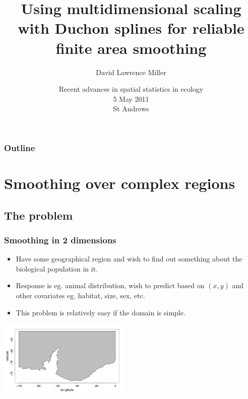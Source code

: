 \documentclass[ignorenonframetext]{beamer} %
\title[Smoothing over complex regions]{Using multidimensional scaling with Duchon splines for reliable finite area smoothing}
\author[Miller]{David Lawrence Miller}
\institute{Mathematical Sciences\\University of Bath}
\date[5 May 2011] {Recent advances in spatial statistics in ecology\\5 May 2011\\St Andrews}
\newcommand{\bc}{\begin{center}}
\newcommand{\ec}{\end{center}}
\newcommand{\bi}{\begin{itemize}}
\newcommand{\ei}{\end{itemize}}
\begin{document}
\begin{frame}
  \titlepage
\end{frame}


 {
\begin{frame}
  \frametitle{Outline}
  \tableofcontents %
\end{frame}
}

\section{Smoothing over complex regions}

\subsection{The problem}

\begin{frame}
	\frametitle{Smoothing in 2 dimensions}
       \bi
         \item Have some geographical region and wish to find out something about the biological population in it. 
         \item Response is eg. animal distribution, wish to predict based on $(x,y)$ and other covariates eg. habitat, size, sex, etc.
         \item This problem is relatively easy if the domain is simple.
       \ei
       \bc
         \includegraphics[width=2.5in]{figs/peninsula.png}
       \ec
\end{frame}
\end{document}
